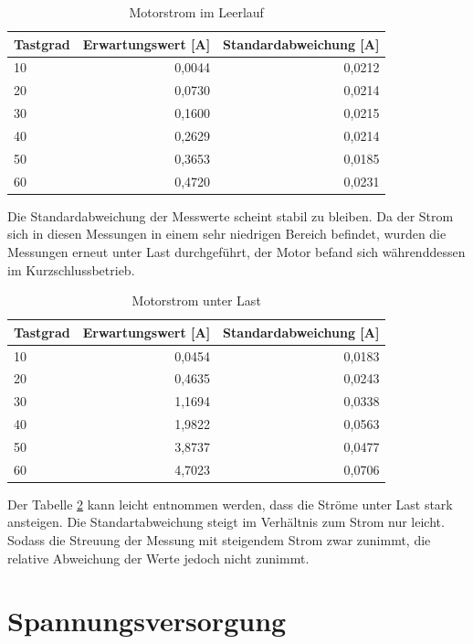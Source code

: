 \begin{table}[H]
  \centering
  \begin{tabularx}{\textwidth}{|X|r|r|}
    \hline
    Tastgrad & Erwartungswert [A] & Standardabweichung [A]  \\ \hline \hline
    10 & 0,0044 & 0,0212\\ \hline
    20 & 0,0730 & 0,0214\\ \hline
    30 & 0,1600 & 0,0215\\ \hline
    40 & 0,2629 & 0,0214\\ \hline
    50 & 0,3653 & 0,0185\\ \hline
    60 & 0,4720 & 0,0231\\ \hline

  \end{tabularx}
  \caption{Motorstrom im Leerlauf}%
  \label{tab:current_noload}
\end{table}

Die Standardabweichung der Messwerte scheint stabil zu bleiben. Da der Strom sich in diesen Messungen in einem sehr niedrigen Bereich befindet, wurden
die Messungen erneut unter Last durchgeführt, der Motor befand sich währenddessen im Kurzschlussbetrieb.

\begin{table}[H]
  \centering
  \begin{tabularx}{\textwidth}{|X|r|r|}
    \hline
    Tastgrad & Erwartungswert [A] & Standardabweichung [A]  \\ \hline \hline
    10 & 0,0454 & 0,0183\\ \hline
    20 & 0,4635 & 0,0243\\ \hline
    30 & 1,1694 & 0,0338\\ \hline
    40 & 1,9822 & 0,0563\\ \hline
    50 & 3,8737 & 0,0477\\ \hline
    60 & 4,7023 & 0,0706\\ \hline
  \end{tabularx}
  \caption{Motorstrom unter Last}%
  \label{tab:current_load}
\end{table}

Der Tabelle \ref{tab:current_load} kann leicht entnommen werden, dass die Ströme unter Last stark ansteigen. Die Standartabweichung steigt im Verhältnis zum Strom nur leicht.
Sodass die Streuung der Messung mit steigendem Strom zwar zunimmt, die relative Abweichung der Werte jedoch nicht zunimmt.


\section{Spannungsversorgung}

